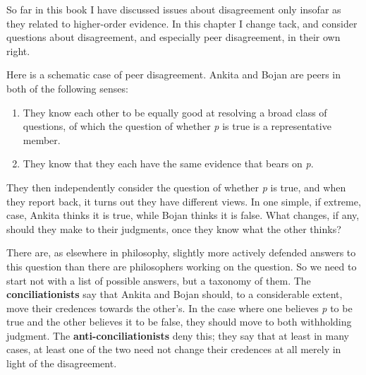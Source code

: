 So far in this book I have discussed issues about disagreement only insofar as they related to higher-order evidence. In this chapter I change tack, and consider questions about disagreement, and especially peer disagreement, in their own right.

Here is a schematic case of peer disagreement. \gls{Ankita} and \gls{Bojan} are peers in both of the following senses:

\begin{enumerate}
\item{} They know each other to be equally good at resolving a broad class of questions, of which the question of whether \emph{p} is true is a representative member.

\item{} They know that they each have the same evidence that bears on \emph{p}.

\end{enumerate}
They then independently consider the question of whether \emph{p} is true, and when they report back, it turns out they have different views. In one simple, if extreme, case, \gls{Ankita} thinks it is true, while \gls{Bojan} thinks it is false. What changes, if any, should they make to their judgments, once they know what the other thinks?

There are, as elsewhere in philosophy, slightly more actively defended answers to this question than there are philosophers working on the question. So we need to start not with a list of possible answers, but a taxonomy of them. The \textbf{conciliationists} say that \gls{Ankita} and \gls{Bojan} should, to a considerable extent, move their credences towards the other's. In the case where one believes \emph{p} to be true and the other believes it to be false, they should move to both withholding judgment. The \textbf{anti-conciliationists} deny this; they say that at least in many cases, at least one of the two need not change their credences at all merely in light of the disagreement.

